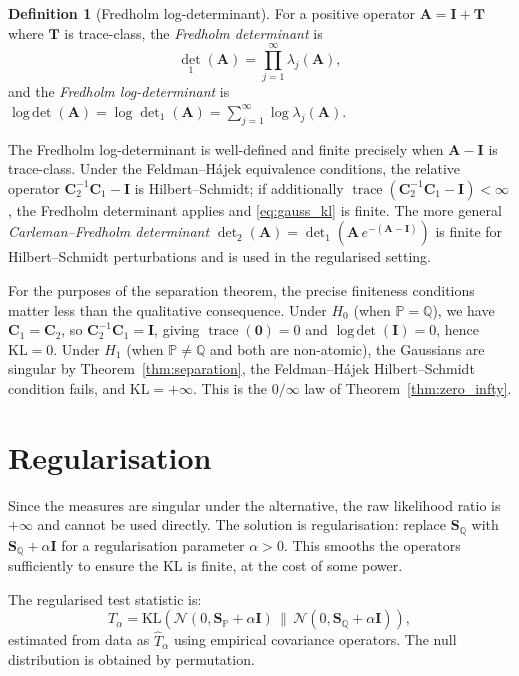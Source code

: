 \documentclass[12pt, oneside]{book}
\theoremstyle{plain}
\theoremstyle{definition}
\newtheorem{definition}[theorem]{Definition}
\newcommand{\calN}{\mathcal{N}}
\newcommand{\PP}{\mathbb{P}}
\newcommand{\QQ}{\mathbb{Q}}
\newcommand{\SP}{\mathbf{S}_{\PP}}
\newcommand{\SQ}{\mathbf{S}_{\QQ}}
\newcommand{\KL}{\mathrm{KL}}
\DeclareMathOperator{\trace}{trace}
\DeclareMathOperator{\logdet}{log\,det}
\begin{document}
\begin{definition}[Fredholm log-determinant]
\label{def:fredholm_logdet}
For a positive operator $\mathbf{A} = \mathbf{I} + \mathbf{T}$ where $\mathbf{T}$ is trace-class, the \emph{Fredholm determinant} is
\begin{equation}
\det_1(\mathbf{A}) = \prod_{j=1}^{\infty} \lambda_j(\mathbf{A}),
\end{equation}
and the \emph{Fredholm log-determinant} is $\logdet(\mathbf{A}) = \log \det_1(\mathbf{A}) = \sum_{j=1}^{\infty} \log \lambda_j(\mathbf{A})$.
\end{definition}

The Fredholm log-determinant is well-defined and finite precisely when $\mathbf{A} - \mathbf{I}$ is trace-class. Under the Feldman--H\'ajek equivalence conditions, the relative operator $\mathbf{C}_2^{-1}\mathbf{C}_1 - \mathbf{I}$ is Hilbert--Schmidt; if additionally $\trace(\mathbf{C}_2^{-1}\mathbf{C}_1 - \mathbf{I}) < \infty$, the Fredholm determinant applies and \eqref{eq:gauss_kl} is finite. The more general \emph{Carleman--Fredholm determinant} $\det_2(\mathbf{A}) = \det_1(\mathbf{A}\,e^{-(\mathbf{A}-\mathbf{I})})$ is finite for Hilbert--Schmidt perturbations and is used in the regularised setting.

For the purposes of the separation theorem, the precise finiteness conditions matter less than the qualitative consequence. Under $H_0$ (when $\PP = \QQ$), we have $\mathbf{C}_1 = \mathbf{C}_2$, so $\mathbf{C}_2^{-1}\mathbf{C}_1 = \mathbf{I}$, giving $\trace(\mathbf{0}) = 0$ and $\logdet(\mathbf{I}) = 0$, hence $\KL = 0$. Under $H_1$ (when $\PP \neq \QQ$ and both are non-atomic), the Gaussians are singular by Theorem~\ref{thm:separation}, the Feldman--H\'ajek Hilbert--Schmidt condition fails, and $\KL = +\infty$. This is the $0/\infty$ law of Theorem~\ref{thm:zero_infty}.

\section{Regularisation}

Since the measures are singular under the alternative, the raw likelihood ratio is $+\infty$ and cannot be used directly. The solution is regularisation: replace $\SQ$ with $\SQ + \alpha \mathbf{I}$ for a regularisation parameter $\alpha > 0$. This smooths the operators sufficiently to ensure the KL is finite, at the cost of some power.

The regularised test statistic is:
\begin{equation}
T_\alpha = \KL\!\left(\calN(0, \SP + \alpha \mathbf{I}) \,\Big\|\, \calN(0, \SQ + \alpha \mathbf{I})\right),
\end{equation}
estimated from data as $\hat T_\alpha$ using empirical covariance operators. The null distribution is obtained by permutation.
\end{document}
